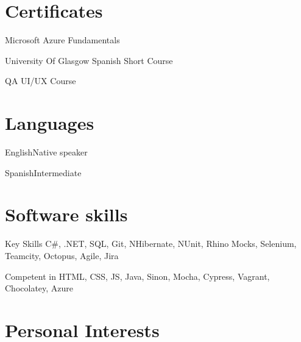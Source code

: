 \documentclass{tccv}
\begin{document}
\section{Certificates}

\begin{factlist}
\item{}{Microsoft Azure Fundamentals}
\item{}{University Of Glasgow Spanish Short Course}
\item{}{QA UI/UX Course}
\end{factlist}

\section{Languages}

\begin{factlist}
\item{English}{Native speaker}
\item{Spanish}{Intermediate}
\end{factlist}

\section{Software skills}

\begin{factlist}

\item{Key Skills}
{C\#, .NET, SQL, Git, NHibernate, NUnit, Rhino Mocks, Selenium, Teamcity, Octopus, Agile, Jira }
    
\item{Competent in}
     {HTML, CSS, JS, Java, Sinon, Mocha, Cypress, Vagrant, Chocolatey, Azure}

\end{factlist}
	 
	

\section{Personal Interests}
\end{document}
